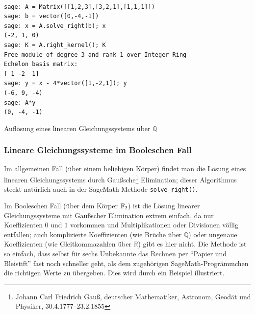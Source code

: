\begin{refsegment}
\begin{sagecode}
\begin{verbatim}

sage: A = Matrix([[1,2,3],[3,2,1],[1,1,1]])
sage: b = vector([0,-4,-1])
sage: x = A.solve_right(b); x
(-2, 1, 0)
sage: K = A.right_kernel(); K
Free module of degree 3 and rank 1 over Integer Ring
Echelon basis matrix:
[ 1 -2  1]
sage: y = x - 4*vector([1,-2,1]); y
(-6, 9, -4)
sage: A*y
(0, -4, -1)
\end{verbatim}
\caption{Auflösung eines linearen
  Gleichungssystems
  über $\mathbb{Q}$}
\label{Sage-code-bool-lin-equ-Q}
\end{sagecode}

\subsubsection*{Lineare Gleichungssysteme im Booleschen Fall}

Im allgemeinen Fall (über einem beliebigen Körper) findet man die
Lösung eines linearen Gleichungssystems
durch Gaußsche\footnote{%
  Johann Carl Friedrich Gauß,
  deutscher Mathematiker, Astronom, Geodät und Physiker, 30.4.1777--23.2.1855
} Elimination; dieser Algorithmus steckt natürlich auch in
der SageMath-Methode {\tt solve\_right()}.

Im Booleschen Fall (über dem Körper $\mathbb{F}_2$) ist die Lösung
linearer
Gleichungssysteme mit Gaußscher Elimination extrem einfach, da nur
Koeffizienten $0$ und $1$ vorkommen und Multiplikationen oder
Divisionen völlig entfallen; auch komplizierte Koeffizienten (wie
Brüche über $\mathbb{Q}$) oder ungenaue Koeffizienten (wie Gleitkommazahlen über
$\mathbb{R}$) gibt es hier nicht. Die Methode ist so einfach, dass selbst für sechs
Unbekannte das Rechnen per "`Papier und Bleistift"' fast noch schneller
geht, als dem zugehörigen SageMath-Progrämmchen die richtigen Werte zu
übergeben. Dies wird durch ein Beispiel illustriert.


\end{refsegment}
